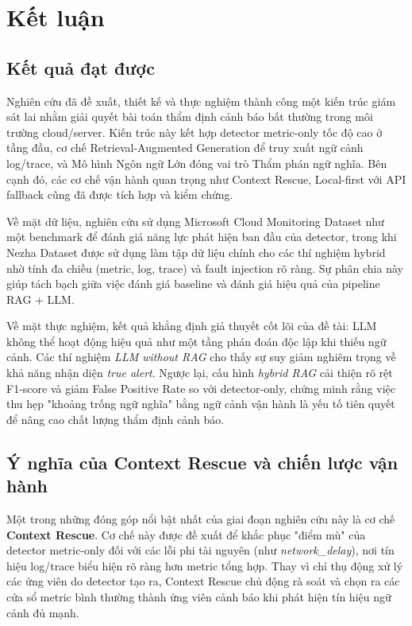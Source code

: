 \section{Kết luận}

\subsection{Kết quả đạt được}

Nghiên cứu đã đề xuất, thiết kế và thực nghiệm thành công một kiến trúc giám sát lai nhằm giải quyết bài toán thẩm định cảnh báo bất thường trong môi trường cloud/server. Kiến trúc này kết hợp detector metric-only tốc độ cao ở tầng đầu, cơ chế Retrieval-Augmented Generation để truy xuất ngữ cảnh log/trace, và Mô hình Ngôn ngữ Lớn đóng vai trò Thẩm phán ngữ nghĩa. Bên cạnh đó, các cơ chế vận hành quan trọng như Context Rescue, Local-first với API fallback cũng đã được tích hợp và kiểm chứng.

Về mặt dữ liệu, nghiên cứu sử dụng Microsoft Cloud Monitoring Dataset như một benchmark để đánh giá năng lực phát hiện ban đầu của detector, trong khi Nezha Dataset được sử dụng làm tập dữ liệu chính cho các thí nghiệm hybrid nhờ tính đa chiều (metric, log, trace) và fault injection rõ ràng. Sự phân chia này giúp tách bạch giữa việc đánh giá baseline và đánh giá hiệu quả của pipeline RAG + LLM.

Về mặt thực nghiệm, kết quả khẳng định giả thuyết cốt lõi của đề tài: LLM không thể hoạt động hiệu quả như một tầng phán đoán độc lập khi thiếu ngữ cảnh. Các thí nghiệm \textit{LLM without RAG} cho thấy sự suy giảm nghiêm trọng về khả năng nhận diện \textit{true alert}. Ngược lại, cấu hình \textit{hybrid RAG} cải thiện rõ rệt F1-score và giảm False Positive Rate so với detector-only, chứng minh rằng việc thu hẹp "khoảng trống ngữ nghĩa" bằng ngữ cảnh vận hành là yếu tố tiên quyết để nâng cao chất lượng thẩm định cảnh báo.

\subsection{Ý nghĩa của Context Rescue và chiến lược vận hành}

Một trong những đóng góp nổi bật nhất của giai đoạn nghiên cứu này là cơ chế \textbf{Context Rescue}. Cơ chế này được đề xuất để khắc phục "điểm mù" của detector metric-only đối với các lỗi phi tài nguyên (như \textit{network\_delay}), nơi tín hiệu log/trace biểu hiện rõ ràng hơn metric tổng hợp. Thay vì chỉ thụ động xử lý các ứng viên do detector tạo ra, Context Rescue chủ động rà soát và chọn ra các cửa sổ metric bình thường thành ứng viên cảnh báo khi phát hiện tín hiệu ngữ cảnh đủ mạnh.

